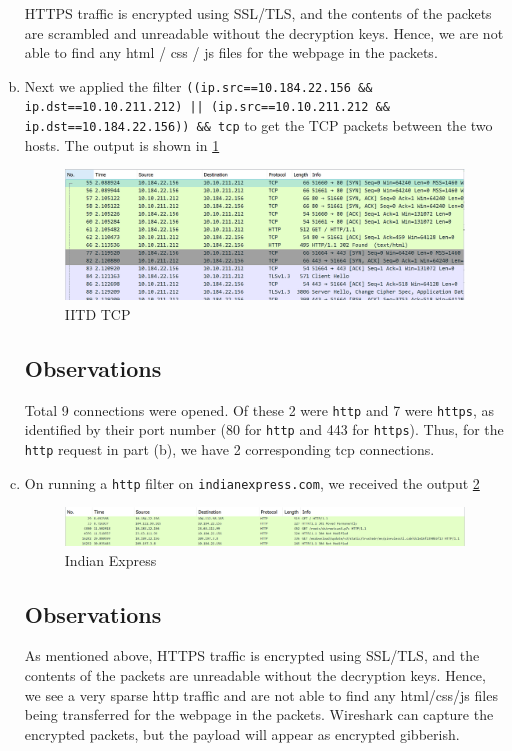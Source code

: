 \begin{enumerate}[a.]
    HTTPS traffic is encrypted using SSL/TLS, and the contents of the packets are scrambled and unreadable without the decryption keys. Hence, we are not able to find any html / css / js files for the webpage in the packets.

    
    \item Next we applied the filter {\tt ((ip.src==10.184.22.156 \&\& ip.dst==10.10.211.212) || (ip.src==10.10.211.212 \&\& ip.dst==10.184.22.156)) \&\& tcp} to get the TCP packets between the two hosts. The output is shown in \cref{fig:IITDTCP}
    \begin{figure}[!ht]
        \centering
        \includegraphics[scale=0.5]{images/IITD tcp.png}
        \caption{IITD TCP}
        \label{fig:IITDTCP}
    \end{figure}
    \subsection*{Observations}
    Total 9 connections were opened. Of these 2 were {\tt http} and 7 were {\tt https}, as identified by their port number (80 for {\tt http} and 443 for {\tt https}). Thus, for the {\tt http} request in part (b), we have 2 corresponding tcp connections. 

    \item On running a {\tt http} filter on {\tt indianexpress.com}, we received the output \cref{fig:IndianExpress}
    \begin{figure}[!ht]
        \centering
        \includegraphics[scale=0.5]{images/indianexpress.png}
        \caption{Indian Express}
        \label{fig:IndianExpress}
    \end{figure}
    \subsection*{Observations}
    As mentioned above, HTTPS traffic is encrypted using SSL/TLS, and the contents of the packets are unreadable without the decryption keys. Hence, we see a very sparse http traffic and are not able to find any html/css/js files being transferred for the webpage in the packets. Wireshark can capture the encrypted packets, but the payload will appear as encrypted gibberish.
\end{enumerate}

